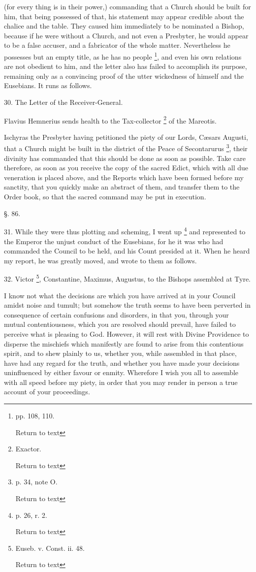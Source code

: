 (for every thing is in their power,) commanding that a Church should
be built for him, that being possessed of that, his statement may
appear credible about the chalice and the table. They caused him
immediately to be nominated a Bishop, because if he were without a
Church, and not even a Presbyter, he would appear to be a false
accuser, and a fabricator of the whole matter. Nevertheless he
possesses but an empty title, as he has no people \footnote{pp. 108, 110.

Return to text}, and even his own relations are not obedient to him, and the
letter also has failed to accomplish its purpose, remaining only as a
convincing proof of the utter wickedness of himself and the Eusebians.
It runs as follows.

30. The Letter of the Receiver-General.

Flavius Hemnerius sends health to the
Tax-collector \footnote{Exactor.

Return to text} of the
Mareotis.

Ischyras the Presbyter having petitioned the
piety of our Lords, Cæsars Augusti, that a Church might be built in
the district of the Peace of Secontarurus \footnote{p. 34, note O.

Return to text}, their divinity has commanded that this should be done as soon
as possible. Take care therefore, as soon as you receive the copy of
the sacred Edict, which with all due veneration is placed above, and
the Reports which have been formed before my sanctity, that you quickly make an abstract of them, and transfer them to the Order book,
so that the sacred command may be put in execution.

§. 86.

31. While they were thus plotting and scheming, I
went up \footnote{p. 26, r. 2.

Return to text} and
represented to the Emperor the unjust conduct of the Eusebians, for he
it was who had commanded the Council to be held, and his Count
presided at it. When he heard my report, he was greatly moved, and
wrote to them as follows.

32. Victor \footnote{Euseb. v. Const. ii. 48.

Return to text}, Constantine, Maximus, Augustus, to the Bishops assembled at
Tyre.

I know not what the decisions are which you have
arrived at in your Council amidst noise and tumult; but somehow the
truth seems to have been perverted in consequence of certain
confusions and disorders, in that you, through your mutual
contentiousness, which you are resolved should prevail, have failed to
perceive what is pleasing to God. However, it will rest with Divine
Providence to disperse the mischiefs which manifestly are found to
arise from this contentious spirit, and to shew plainly to us, whether
you, while assembled in that place, have had any regard for the truth,
and whether you have made your decisions uninfluenced by either favour
or enmity. Wherefore I wish you all to assemble with all speed before
my piety, in order that you may render in person a true account of
your proceedings.


